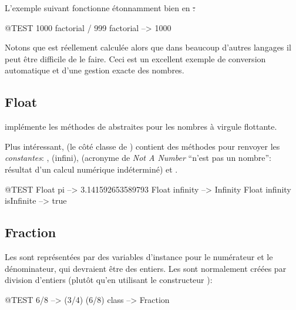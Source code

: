 \documentclass[a4paper,10pt,twoside]{book}
\begin{document}
L'exemple suivant fonctionne \'etonnamment bien en \st:
\begin{code}{@TEST}
1000 factorial / 999 factorial --> 1000
\end{code}
Notons que  est r\'eellement calcul\'ee alors que dans beaucoup d'autres langages il peut \^etre difficile de le faire. Ceci est un excellent exemple de conversion automatique et d'une gestion exacte des nombres.


\subsection{Float}

 impl\'emente les m\'ethodes de  abstraites pour les nombres \`a virgule flottante.

Plus int\'eressant,  (\ie le c\^ot\'e classe de
) contient des m\'ethodes pour renvoyer les
\emph{constantes}: , 
(infini), 
(acronyme de \emph{Not A Number} \cad ``n'est pas un nombre'':
r\'esultat d'un calcul num\'erique ind\'etermin\'e)
et .

\begin{code}{@TEST}
Float pi                      --> 3.141592653589793
Float infinity               --> Infinity
Float infinity isInfinite --> true
\end{code}

\subsection{Fraction}

Les  sont repr\'esent\'ees par des variables d'instance pour le num\'erateur et le d\'enominateur, qui devraient \^etre des entiers. Les  sont normalement cr\'e\'ees par division d'entiers (plut\^ot qu'en utilisant le constructeur ):

\begin{code}{@TEST}
6/8             --> (3/4)
(6/8) class --> Fraction
\end{code}
\end{document}

